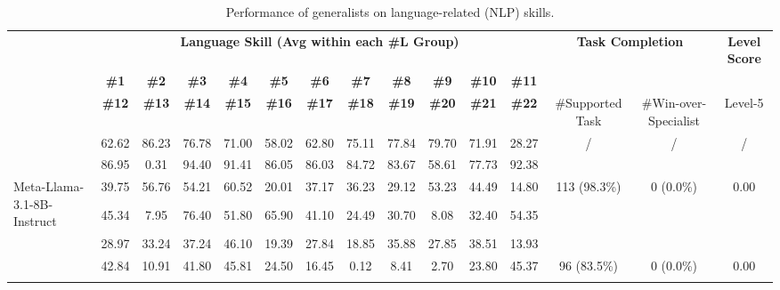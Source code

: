 \documentclass[letterpaper]{article} %
\begin{document}
{
\begin{table}[t!]
\centering
  \fontsize{7.5}{8}\selectfont 
  \setlength{\tabcolsep}{1.4mm}
\caption{
Performance of generalists on language-related (NLP) skills.
}
\vspace{-2mm}
\label{tab:main-overall-results-nlp}
\begin{tabular}{p{2.2cm} ccccccccccc cc c}
\toprule
\rowcolor{bg-tb-heavey-nlp} & \multicolumn{11}{c}{\bf \textcolor{redNLP}{Language Skill (Avg within each \#L Group)}} & \multicolumn{2}{c}{\bf Task Completion} & \multicolumn{1}{c}{\bf Level Score} \\ 
\rowcolor{bg-tb-heavey-nlp} & \bf  \#1 & \bf\#2 & \bf\#3 & \bf\#4 & \bf\#5 & \bf\#6 & \bf\#7 & \bf\#8 & \bf\#9 & \bf\#10 & \bf\#11 & 
 &  &  \\
\rowcolor{bg-tb-heavey-nlp} \multicolumn{1}{c}{\multirow{-3}{*}{\bf  Model}}  & \bf\#12 & \bf\#13 & \bf\#14 & \bf\#15 & \bf\#16 & \bf\#17 & \bf\#18 & \bf\#19 & \bf\#20 & \bf\#21  & \bf  \#22 & 
\multicolumn{1}{c}{\multirow{-2}{*}{\parbox{1.2cm}{\#Supported Task}}} & \multicolumn{1}{c}{\multirow{-2}{*}{\parbox{1.2cm}{\#Win-over-Specialist}}} & \multirow{-2}{*}{Level-5}  \\



  \midrule

\rowcolor{bg-tb-light-nlp} & 62.62 	&	86.23 	&	76.78 	&	71.00 	&	58.02 	&	62.80 	&	75.11 	&	77.84 	&	79.70 	&	71.91 	&	28.27  & \multirow{2}{*}{/} & \multirow{2}{*}{/} & \multirow{2}{*}{/}  \\
\rowcolor{bg-tb-light-nlp} \multirow{-2}{*}{\bf SoTA Specialist} & 86.95 	&	0.31 	&	94.40 	&	91.41 	&	86.05 	&	86.03 	&	84.72 	&	83.67 	&	58.61 	&	77.73 	&	92.38  &  &  &  \\



\midrule\midrule

\multirow{2}{*}{\parbox{2cm}{Meta-Llama-3.1-8B-Instruct}} & 39.75 	&	56.76 	&	54.21 	&	60.52 	&	20.01 	&	37.17 	&	36.23 	&	29.12 	&	53.23 	&	44.49 	&	14.80  & \multirow{2}{*}{113 (98.3\%)} & \multirow{2}{*}{0 (0.0\%)} & \multirow{2}{*}{0.00} \\
 &  45.34 	&	7.95 	&	76.40 	&	51.80 	&	65.90 	&	41.10 	&	24.49 	&	30.70 	&	8.08 	&	32.40 	&	54.35  &  &  &  \\
\addlinespace[4pt]
 


\rowcolor{bg-tb-light-nlp} & 28.97 	&	33.24 	&	37.24 	&	46.10 	&	19.39 	&	27.84 	&	18.85 	&	35.88 	&	27.85 	&	38.51 	&	13.93   &   &  &  \\
\rowcolor{bg-tb-light-nlp} \multirow{-2}{*}{ChatGLM-6b}  & 42.84 	&	10.91 	&	41.80 	&	45.81 	&	24.50 	&	16.45 	&	0.12 	&	8.41 	&	2.70 	&	23.80 	&	45.37  & \multirow{-2}{*}{96 (83.5\%)} & \multirow{-2}{*}{0 (0.0\%)} & \multirow{-2}{*}{0.00} \\
\addlinespace[4pt]




\end{tabular}
\end{table}}
\end{document}
